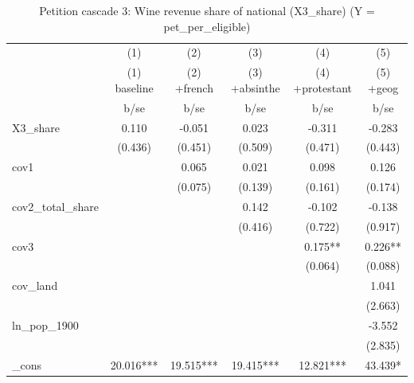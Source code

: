 \begin{table}[htbp]\centering
\def\sym#1{\ifmmode^{#1}\else\(^{#1}\)\fi}
\caption{Petition cascade 3: Wine revenue share of national (X3\_share)  (Y = pet\_per\_eligible) \label{tab:petcasc3}}
\begin{tabular}{l*{5}{c}}
\toprule
            &\multicolumn{1}{c}{(1)}&\multicolumn{1}{c}{(2)}&\multicolumn{1}{c}{(3)}&\multicolumn{1}{c}{(4)}&\multicolumn{1}{c}{(5)}\\
            &\multicolumn{1}{c}{(1) baseline}&\multicolumn{1}{c}{(2) +french}&\multicolumn{1}{c}{(3) +absinthe}&\multicolumn{1}{c}{(4) +protestant}&\multicolumn{1}{c}{(5) +geog}\\
            &        b/se   &        b/se   &        b/se   &        b/se   &        b/se   \\
\midrule
X3\_share    &       0.110   &      -0.051   &       0.023   &      -0.311   &      -0.283   \\
            &     (0.436)   &     (0.451)   &     (0.509)   &     (0.471)   &     (0.443)   \\
cov1        &               &       0.065   &       0.021   &       0.098   &       0.126   \\
            &               &     (0.075)   &     (0.139)   &     (0.161)   &     (0.174)   \\
cov2\_total\_share&               &               &       0.142   &      -0.102   &      -0.138   \\
            &               &               &     (0.416)   &     (0.722)   &     (0.917)   \\
cov3        &               &               &               &       0.175** &       0.226** \\
            &               &               &               &     (0.064)   &     (0.088)   \\
cov\_land    &               &               &               &               &       1.041   \\
            &               &               &               &               &     (2.663)   \\
ln\_pop\_1900 &               &               &               &               &      -3.552   \\
            &               &               &               &               &     (2.835)   \\
\_cons      &      20.016***&      19.515***&      19.415***&      12.821***&      43.439*  \\

\end{tabular}
\end{table}
